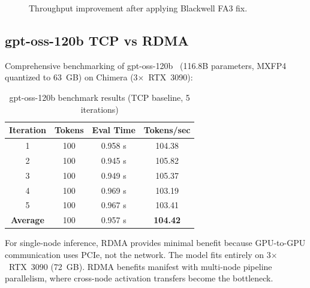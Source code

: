 \documentclass[11pt,letterpaper]{article}
\theoremstyle{definition}
\begin{document}
\begin{figure}[htbp]
\centering
{}
\caption{Throughput improvement after applying Blackwell FA3 fix.}
\label{fig:fa3-bar}
\end{figure}

\subsection{gpt-oss-120b TCP vs RDMA}

Comprehensive benchmarking of gpt-oss-120b~\cite{gptoss-hf} (116.8B parameters, MXFP4~\cite{rouhani2023mxfp4} quantized to 63~GB) on Chimera (3$\times$~RTX~3090):

\begin{table}[htbp]
\centering
\caption{gpt-oss-120b benchmark results (TCP baseline, 5 iterations)}
\label{tab:gptoss-results}
\begin{tabular}{@{}cccc@{}}
\toprule
\textbf{Iteration} & \textbf{Tokens} & \textbf{Eval Time} & \textbf{Tokens/sec} \\
\midrule
1 & 100 & 0.958 s & 104.38 \\
2 & 100 & 0.945 s & 105.82 \\
3 & 100 & 0.949 s & 105.37 \\
4 & 100 & 0.969 s & 103.19 \\
5 & 100 & 0.967 s & 103.41 \\
\midrule
\textbf{Average} & 100 & 0.957 s & \textbf{104.42} \\
\bottomrule
\end{tabular}
\end{table}

For single-node inference, RDMA provides minimal benefit because GPU-to-GPU communication uses PCIe, not the network. The model fits entirely on 3$\times$~RTX~3090 (72~GB). RDMA benefits manifest with multi-node pipeline parallelism, where cross-node activation transfers become the bottleneck.
\end{document}
